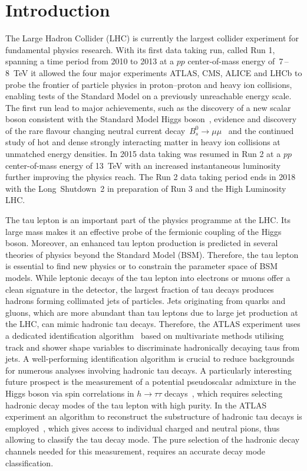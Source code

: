 \chapter*{Introduction}
\label{sec:intro}

The Large Hadron Collider (LHC) is currently the largest collider experiment for
fundamental physics research. With its first data taking run, called Run 1,
spanning a time period from 2010 to 2013 at a $pp$ center-of-mass energy
of~\num{7}\,--\,\SI{8}{\TeV} it allowed the four major experiments ATLAS, CMS,
ALICE and LHCb to probe the frontier of particle physics in proton--proton and
heavy ion collisions, enabling tests of the Standard Model on a previously
unreachable energy scale. The first run lead to major achievements, such as the
discovery of a new scalar boson consistent with the Standard Model Higgs
boson~\cite{higgs_atlas, higgs_cms}, evidence and discovery of the rare flavour
changing neutral current decay~$B_s^0 \to \mu \mu$~\cite{lhcb_bs_mumu,
  cms_bs_mumu} and the continued study of hot and dense strongly interacting
matter in heavy ion collisions at unmatched energy densities. In 2015 data
taking was resumed in Run 2 at a $pp$ center-of-mass energy of \SI{13}{\TeV}
with an increased instantaneous luminosity further improving the physics reach.
The Run 2 data taking period ends in 2018 with the Long~Shutdown~2 in
preparation of Run 3 and the High Luminosity LHC.

The tau lepton is an important part of the physics programme at the LHC. Its
large mass makes it an effective probe of the fermionic coupling of the Higgs
boson. Moreover, an enhanced tau lepton production is predicted in several
theories of physics beyond the Standard Model (BSM). Therefore, the tau lepton
is essential to find new physics or to constrain the parameter space of BSM
models. While leptonic decays of the tau lepton into electrons or muons offer a
clean signature in the detector, the largest fraction of tau decays produces
hadrons forming collimated jets of particles. Jets originating from quarks and
gluons, which are more abundant than tau leptons due to large jet production at
the LHC, can mimic hadronic tau decays. Therefore, the ATLAS experiment uses a
dedicated identification algorithm~\cite{atlas:taurec:run1, atlas:taurec:run2}
based on multivariate methods utilising track and shower shape variables to
discriminate hadronically decaying taus from jets. A well-performing
identification algorithm is crucial to reduce backgrounds for numerous analyses
involving hadronic tau decays. A particularly interesting future prospect is the
measurement of a potential pseudoscalar admixture in the Higgs boson via spin
correlations in $h \to \tau\tau$ decays~\cite{desch_higgs_cp, harnik,
  Berge2014}, which requires selecting hadronic decay modes of the tau lepton
with high purity. In the ATLAS experiment an algorithm to reconstruct the
substructure of hadronic tau decays is employed~\cite{atlas:taurec:decaymodes},
which gives access to individual charged and neutral pions, thus allowing to
classify the tau decay mode. The pure selection of the hadronic decay channels
needed for this measurement, requires an accurate decay mode classification.

